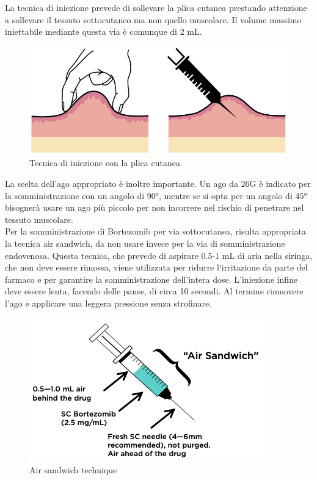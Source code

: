 La tecnica di iniezione prevede di sollevare la plica cutanea prestando attenzione a sollevare il tessuto 
sottocutaneo ma non quello muscolare. Il volume massimo iniettabile mediante questa via è comunque di 2 mL.\\

\begin{figure}[H]
    \begin{center}
    \includegraphics[width=0.6\columnwidth]{img/PLICA.png}
    \end{center}
    \caption[ Tecnica di iniezione con la plica cutanea.]{ Tecnica di iniezione con la plica cutanea.
    \cite{img33}}

\end{figure}

La scelta dell’ago appropriato è inoltre importante. Un ago da 26G è indicato per la somministrazione con un angolo di
90°, mentre se si opta per un angolo di 45° bisognerà usare un ago più piccolo per non incorrere nel rischio di 
penetrare nel tessuto muscolare\cite{BORTNURSES}.\\
Per la somministrazione di Bortezomib per via sottocutanea, risulta appropriata la tecnica air sandwich, 
da non usare invece per la via di somministrazione endovenosa. Questa tecnica, che prevede di aspirare 0.5-1 mL 
di aria nella siringa, che non deve essere rimossa, viene utilizzata per ridurre l‘irritazione da parte del farmaco e 
per garantire la somministrazione dell’intera dose. L’iniezione infine deve essere lenta, facendo delle pause, 
di circa 10 secondi. Al termine rimuovere l’ago e applicare una leggera pressione senza strofinare\cite{BORTNURSES}.\\

\begin{figure}[H]
    \begin{center}
    \includegraphics[width=0.6\columnwidth]{img/SIRINGA.png}
    \end{center}
    \caption[ Air sandwich technique]{ Air sandwich technique
    \cite{img34}}

\end{figure}


